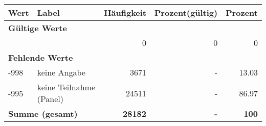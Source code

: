      \begin{longtable}{lXrrr}
     \toprule
     \textbf{Wert} & \textbf{Label} & \textbf{Häufigkeit} & \textbf{Prozent(gültig)} & \textbf{Prozent} \\
     \endhead
     \midrule
     \multicolumn{5}{l}{\textbf{Gültige Werte}}\\
      & & 0 & 0 & 0 \\
     \midrule
     \multicolumn{5}{l}{\textbf{Fehlende Werte}}\\
       -998 &
       keine Angabe &
         \num{3671} &
        - &
         \num[round-mode=places,round-precision=2]{13.03} \\
       -995 &
       keine Teilnahme (Panel) &
         \num{24511} &
        - &
         \num[round-mode=places,round-precision=2]{86.97} \\
     \midrule
     \multicolumn{2}{l}{\textbf{Summe (gesamt)}} &
          \textbf{\num{28182}} &
        \textbf{-} &
        \textbf{100} \\
     \bottomrule
     \end{longtable}
     
